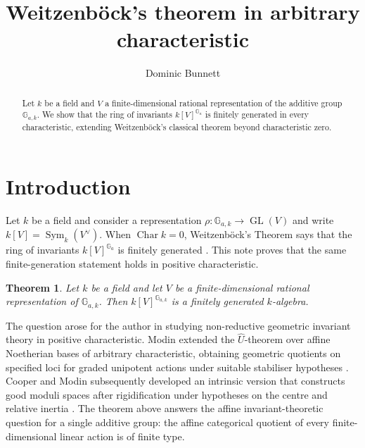\documentclass[11pt]{amsart}
\theoremstyle{plain}
\newtheorem{theorem}{Theorem}[section]
\numberwithin{equation}{section}
\DeclareMathOperator{\GL}{GL}
\DeclareMathOperator{\Char}{Char}
\newcommand{\GG}{\mathbb{G}}
\begin{document}
\title[Weitzenb\"ock's theorem in arbitrary characteristic]{Weitzenb\"ock's theorem in arbitrary characteristic}

\author{Dominic Bunnett}
\address{Institut f\"ur Mathematik, Technische Universit\"at Berlin, Stra\ss e des 17.~Juni 136, 10623 Berlin, Germany}


\date{}

\begin{abstract}
Let \(k\) be a field and \(V\) a finite-dimensional rational representation of the additive group \(\GG_{a,k}\).
We show that the ring of invariants \(k[V]^{\GG_a}\) is finitely generated in every characteristic, extending Weitzenb\"ock's classical theorem beyond characteristic zero.
\end{abstract}

\maketitle

\section{Introduction}

Let \(k\) be a field and consider a representation \(\rho : \GG_{a,k} \to \GL(V)\) and write \(k[V]=\operatorname{Sym}_k(V^\vee)\).
When \(\Char k =0\), Weitzenb\"ock's Theorem says that the ring of invariants \(k[V]^{\GG_a}\) is finitely generated \cite{Weitzenbock}.
This note proves that the same finite-generation statement holds in positive characteristic.

\begin{theorem}\label{thm:main}
Let \(k\) be a field and let \(V\) be a finite-dimensional rational
representation of \(\mathbb G_{a,k}\). Then \(k[V]^{\mathbb G_{a,k}}\) is a
finitely generated \(k\)-algebra.
\end{theorem}

The question arose for the author in studying non-reductive geometric invariant theory in positive characteristic.
Modin extended the \(\widehat U\)-theorem over affine Noetherian bases of arbitrary characteristic, obtaining geometric quotients on specified loci for graded unipotent actions under suitable stabiliser hypotheses \cite{Modin}.
Cooper and Modin subsequently developed an intrinsic version that constructs good moduli spaces after rigidification under hypotheses on the centre and relative inertia \cite{CooperModin}.
The theorem above answers the affine invariant-theoretic question for a single additive group: the affine categorical quotient of every finite-dimensional linear action is of finite type.
\end{document}
